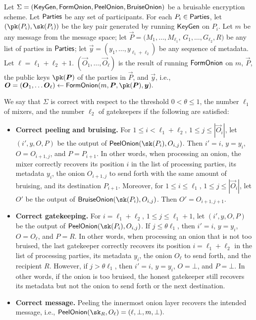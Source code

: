 Let $\Sigma = (\mathsf{KeyGen}, \mathsf{FormOnion}, \mathsf{PeelOnion}, \mathsf{BruiseOnion})$ be a bruisable encryption scheme. 
%
Let $\mathsf{Parties}$ be any set of participants. 
%
For each $P_i \in \mathsf{Parties}$, let $(\pk(P_i), \sk(P_i))$ be the key pair generated by running $\mathsf{KeyGen}$ on $P_i$. %
%
Let $m$ be any message from the message space; 
let $\vec{P} = (M_1, \dots, M_{\ell_1}$, $G_{1}, \dots, G_{\ell_2}, R)$ be any list of parties in $\mathsf{Parties}$; 
let $\vec{y} = (y_1, \dots, y_{\ell_1+\ell_2})$ be any sequence of metadata. 
Let $\ell=\ell_1+\ell_2+1$. 
$(\vec{O}_1, \dots, \vec{O}_{\ell})$ is the result of running $\mathsf{FormOnion}$ on $m$, $\vec{P}$, the public keys $\pk(\vec{P})$ of the parties in $\vec{P}$, and $\vec{y}$, i.e., 
$
\vec{O} = (\vec{O}_1, \dots \vec{O}_{\ell}) \gets \formonion(m, \vec{P}, \pk(\vec{P}), \vec{y}).
$

We say that $\Sigma$ is correct with respect to the threshold $0 < \theta \le 1$, the number $\ell_1$ of mixers, and the number $\ell_2$ of gatekeepers if the following are satisfied: 

\begin{itemize}
\item \textbf{Correct peeling and bruising.} 
\sloppy 
For $1\leq i < \ell_1+\ell_2$, $1\leq j \leq |\vec{O}_i|$, let $(i',y,O,P)$ be the output of $\proconion(\sk(P_i),O_{i,j})$.  Then $i'=i$, $y=y_i$, $O=O_{i+1,j}$, and $P=P_{i+1}$.  In other words, when processing an onion, the mixer correctly recovers its position $i$ in the list of processing parties, its metadata $y_i$, the onion $O_{i+1,j}$ to send forth  with the same amount of bruising, and its destination $P_{i+1}$.  Moreover, for $1\leq i \le \ell_1$, $1\leq j \leq |\vec{O}_i|$, let $O'$ be the output of $\bruiseonion(\sk(P_i),O_{i,j})$.  Then $O' = O_{i+1,j+1}$.
 
\item \textbf{Correct gatekeeping.} For $i=\ell_1+\ell_2$, $1\leq j \leq \ell_1+1$, let $(i', y,O,P)$ be the output of $\proconion(\sk(P_i),O_{i,j})$.  If $j \leq \theta \ell_1$, then $i'=i$, $y=y_i$, $O=O_\ell$, and $P=R$.  In other words, when processing an onion that is not too bruised, the last gatekeeper correctly recovers its position $i=\ell_1+\ell_2$ in the list of processing parties, its metadata $y_i$, the onion $O_\ell$ to send forth, and the recipient $R$.  However, if $j > \theta \ell_1$,  then $i'=i$, $y=y_i$, $O=\bot$, and $P=\bot$.  In other words, if the onion is too bruised, the honest gatekeeper still recovers its metadata but not the onion to send forth or the next destination. 

\item \textbf{Correct message.} Peeling the innermost onion layer recovers the intended message, i.e., 
$
\proconion(\sk_{R}, O_{\ell}) = (\ell,\bot,m,\bot).
$
\end{itemize}












